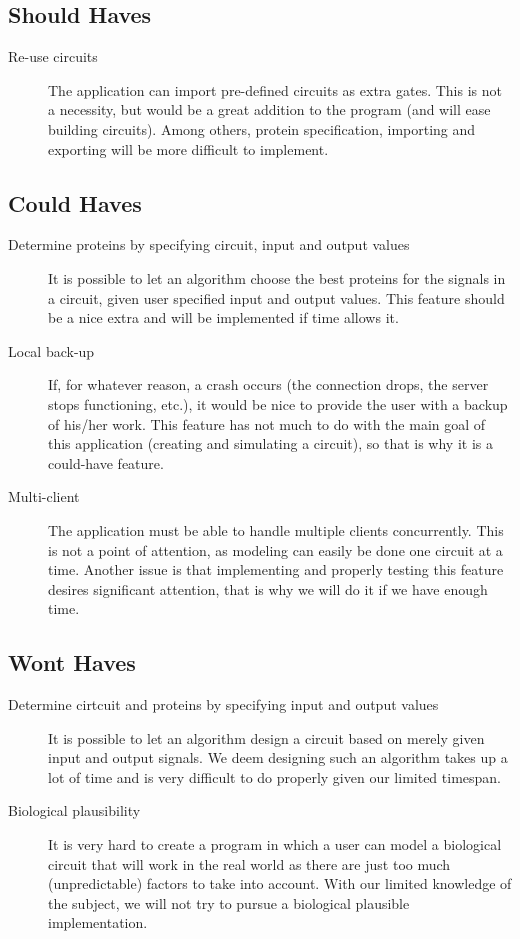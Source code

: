 \documentclass[a4paper]{article}
\begin{document}
\subsection{Should Haves}
\begin{description}
\item[Re-use circuits] The application can import pre-defined circuits as extra gates. This is not a necessity, but would be a great addition to the program (and will ease building circuits). Among others, protein specification, importing and exporting will be more difficult to implement.
\end{description}

\subsection{Could Haves}
\begin{description}
\item[Determine proteins by specifying circuit, input and output values] It is possible to let an algorithm choose the best proteins for the signals in a circuit, given user specified input and output values. This feature should be a nice extra and will be implemented if time allows it.
\item[Local back-up] If, for whatever reason, a crash occurs (the connection drops, the server stops functioning, etc.), it would be nice to provide the user with a backup of his/her work. This feature has not much to do with the main goal of this application (creating and simulating a circuit), so that is why it is a could-have feature.
\item[Multi-client] The application must be able to handle multiple clients concurrently. This is not a point of attention, as modeling can easily be done one circuit at a time. Another issue is that implementing and properly testing this feature desires significant attention, that is why we will do it if we have enough time.
\end{description}

\subsection{Wont Haves}
\begin{description}
\item[Determine cirtcuit and proteins by specifying input and output values] It is possible to let an algorithm design a circuit based on merely given input and output signals. We deem designing such an algorithm takes up a lot of time and is very difficult to do properly given our limited timespan.
\item[Biological plausibility] It is very hard to create a program in which a user can model a biological circuit that will work in the real world as there are just too much (unpredictable) factors to take into account. With our limited knowledge of the subject, we will not try to pursue a biological plausible implementation.
\end{description}
\end{document}
